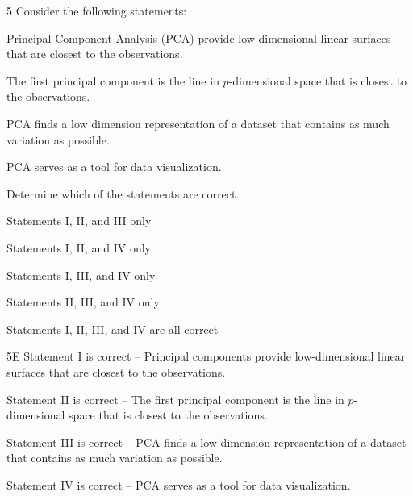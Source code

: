 \begin{question}{5}
Consider the following statements:
\begin{statements}
\item Principal Component Analysis (PCA) provide low-dimensional linear surfaces that are closest to the observations.
\item The first principal component is the line in $p$-dimensional space that is closest to the observations.
\item PCA finds a low dimension representation of a dataset that contains as much variation as possible.
\item PCA serves as a tool for data visualization.
\end{statements}

Determine which of the statements are correct.

\begin{choices}
\item Statements I, II, and III only
\item Statements I, II, and IV only
\item Statements I, III, and IV only
\item Statements II, III, and IV only
\item Statements I, II, III, and IV are all correct
\end{choices}
\end{question}
\begin{solution}{5}{E}
Statement I is correct -- Principal components provide low-dimensional linear surfaces that are closest to the observations.

Statement II is correct -- The first principal component is the line in $p$-dimensional space that is closest to the observations.

Statement III is correct -- PCA finds a low dimension representation of a dataset that contains as much variation as possible.

Statement IV is correct -- PCA serves as a tool for data visualization.
\end{solution}

